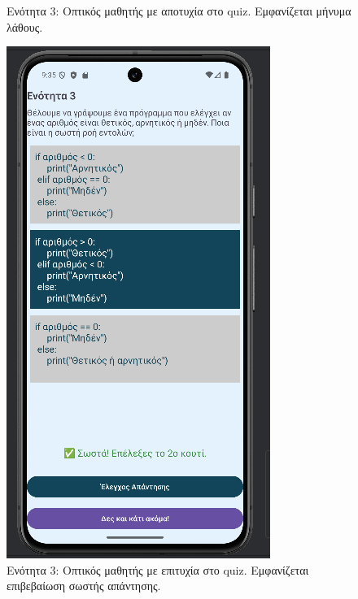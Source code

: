 \documentclass[11pt]{report}
\begin{document}
\begin{figure}[H]
\begin{minipage}[b]{0.45\textwidth}
    \caption{Ενότητα 3: Οπτικός μαθητής με αποτυχία στο quiz. Εμφανίζεται μήνυμα λάθους.}
  \end{minipage}
  \hfill
  \begin{minipage}[b]{0.45\textwidth}
    \includegraphics[width=\linewidth, height=0.35\textheight, keepaspectratio]{Figures/εικόνα (7).png}
    \caption{Ενότητα 3: Οπτικός μαθητής με επιτυχία στο quiz. Εμφανίζεται επιβεβαίωση σωστής απάντησης.}
  \end{minipage}
\end{figure}
\end{document}
